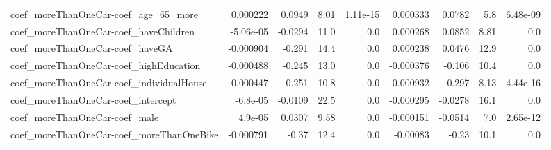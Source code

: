 \begin{tabular}{lrrrrrrrr}
coef_moreThanOneCar-coef_age_65_more & 0.000222 & 0.0949 & 8.01 & 1.11e-15 & 0.000333 & 0.0782 & 5.8 & 6.48e-09 \\
coef_moreThanOneCar-coef_haveChildren & -5.06e-05 & -0.0294 & 11.0 & 0.0 & 0.000268 & 0.0852 & 8.81 & 0.0 \\
coef_moreThanOneCar-coef_haveGA & -0.000904 & -0.291 & 14.4 & 0.0 & 0.000238 & 0.0476 & 12.9 & 0.0 \\
coef_moreThanOneCar-coef_highEducation & -0.000488 & -0.245 & 13.0 & 0.0 & -0.000376 & -0.106 & 10.4 & 0.0 \\
coef_moreThanOneCar-coef_individualHouse & -0.000447 & -0.251 & 10.8 & 0.0 & -0.000932 & -0.297 & 8.13 & 4.44e-16 \\
coef_moreThanOneCar-coef_intercept & -6.8e-05 & -0.0109 & 22.5 & 0.0 & -0.000295 & -0.0278 & 16.1 & 0.0 \\
coef_moreThanOneCar-coef_male & 4.9e-05 & 0.0307 & 9.58 & 0.0 & -0.000151 & -0.0514 & 7.0 & 2.65e-12 \\
coef_moreThanOneCar-coef_moreThanOneBike & -0.000791 & -0.37 & 12.4 & 0.0 & -0.00083 & -0.23 & 10.1 & 0.0 \\
\end{tabular}
